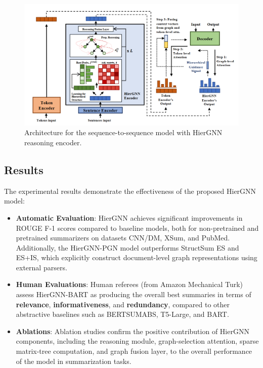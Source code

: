 \documentclass{article}
\begin{document}
\begin{figure}[h]
  \centering
  \includegraphics[width=1\textwidth]{Images/Model.png}
  \caption{Architecture for the sequence-to-sequence model with HierGNN reasoning encoder.}
  \label{fig:model_diagram}
\end{figure}

\pagebreak

\subsection{Results}
The experimental results demonstrate the effectiveness of the proposed HierGNN model:
\begin{itemize}
    \item \textbf{Automatic Evaluation}: HierGNN achieves significant improvements in ROUGE F-1 scores compared to baseline models, both for non-pretrained and pretrained summarizers on datasets CNN/DM, XSum, and PubMed. Additionally, the HierGNN-PGN model outperforms StructSum ES and ES+IS, which explicitly construct document-level graph representations using external parsers.
    \item \textbf{Human Evaluations}: Human referees (from Amazon Mechanical Turk) assess HierGNN-BART as producing the overall best summaries in terms of \textbf{relevance}, \textbf{informativeness}, and \textbf{redundancy}, compared to other abstractive baselines such as BERTSUMABS, T5-Large, and BART.
    \item \textbf{Ablations}: Ablation studies confirm the positive contribution of HierGNN components, including the reasoning module, graph-selection attention, sparse matrix-tree computation, and graph fusion layer, to the overall performance of the model in summarization tasks.
\end{itemize}
\end{document}
